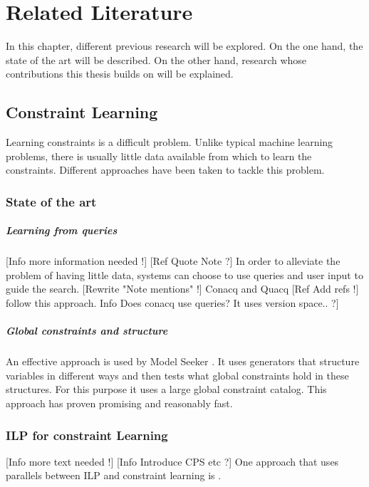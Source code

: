 \chapter{Related Literature}
\label{cha:rellit}

In this chapter, different previous research will be explored.
On the one hand, the state of the art will be described.
On the other hand, research whose contributions this thesis builds on will be explained.

\section{Constraint Learning}
Learning constraints is a difficult problem.
Unlike typical machine learning problems, there is usually little data available from which to learn the constraints.
Different approaches have been taken to tackle this problem.

\subsection{State of the art}
\paragraph{Learning from queries}
[Info more information needed !] [Ref Quote Note ?]
In order to alleviate the problem of having little data, systems can choose to use queries and user input to guide the search.
[Rewrite "Note mentions" !] Conacq and Quacq [Ref Add refs !] follow this approach. 
Info Does conacq use queries? It uses version space.. ?]

\paragraph{Global constraints and structure}
An effective approach is used by Model Seeker \cite{Beldiceanu:ModelSeeker}.
It uses generators that structure variables in different ways and then tests what global constraints hold in these structures.
For this purpose it uses a large global constraint catalog.
This approach has proven promising and reasonably fast.

\subsection{ILP for constraint Learning}
[Info more text needed !] [Info Introduce CPS etc ?]
One approach that uses parallels between ILP and constraint learning is \cite{Lallouet:LearningCP}.

